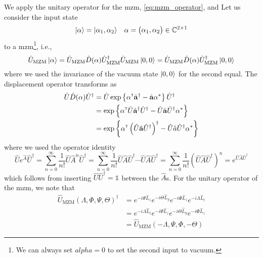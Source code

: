 We apply the unitary operator for the \gls{mzm}, \cref{eq:mzm_operator}, and 
Let us consider the input state
\begin{align}
	\ket{\vb{\alpha}}
	&=
	\ket{\alpha_1,\alpha_2}
	&
	\vb{\alpha}
	=
	\begin{pmatrix}
		\alpha_1,
		\alpha_2
	\end{pmatrix}
	\in
	\mathbb{C}^{2\times1}
\end{align}
to a \gls{mzm}\footnote{We can always set $alpha=0$ to set the second input to vacuum.}, i.e.,
\begin{equation}
	\hat{U}_\text{MZM}
	\ket{\vb{\alpha}}
	=
	\hat{U}_\text{MZM}
	\hat{D}(\vb{\alpha})
	\hat{U}_\text{MZM}^\dagger
	\hat{U}_\text{MZM}
	\ket{0,0}
	=
	\hat{U}_\text{MZM}
	\hat{D}(\vb{\alpha})
	\hat{U}_\text{MZM}^\dagger
	\ket{0,0}
\end{equation}
where we used the invariance of the vacuum state $\ket{0,0}$ for the second equal.
The displacement operator transforms as
\begin{equation}
	\begin{split}
		\hat{U}
		\hat{D}(\vb{\alpha})
		\hat{U}^\dagger
		&=
		\hat{U}
		\exp\left\{
			\vb{\alpha}^{\scriptscriptstyle\mathsf{T}}
			\hat{\vb{a}}^\dagger
			-
			\hat{\vb{a}}
			\vb{\alpha}^*
		\right\}
		\hat{U}^\dagger
		\\
		&=
		\exp\left\{
			\vb{\alpha}^{\scriptscriptstyle\mathsf{T}}
			\hat{U}
			\hat{\vb{a}}^\dagger
			\hat{U}^\dagger
			-
			\hat{U}
			\hat{\vb{a}}
			\hat{U}^\dagger
			\vb{\alpha}^*
		\right\}
		\\
		&=
		\exp\left\{
			\vb{\alpha}^{\scriptscriptstyle\mathsf{T}}
			\left(
				\hat{U}
				\hat{\vb{a}}
				\hat{U}^\dagger
			\right)^\dagger
			-
			\hat{U}
			\hat{a}
			\hat{U}^\dagger
			\vb{\alpha}^*
		\right\}
	\end{split}
\end{equation}
where we used the operator identity
\begin{equation}
	\hat{U}
	e^{\hat{A}}
	\hat{U}^\dagger
	=
	\sum_{n=0}^\infty
	\frac{1}{n!}
	\hat{U}
	\hat{A}^n
	\hat{U}^\dagger
	=
	\sum_{n=0}^\infty
	\frac{1}{n!}
	\hat{U}
	\hat{A}
	\hat{U}^\dagger
	\cdots
	\hat{U}
	\hat{A}
	\hat{U}^\dagger
	=
	\sum_{n=0}^\infty
	\frac{1}{n!}
	\left(
		\hat{U}
		\hat{A}
		\hat{U}^\dagger
	\right)^n
	=
	e^{\hat{U}\hat{A}\hat{U}^\dagger}
\end{equation}
which follows from inserting $\hat{U}\hat{U}^\dagger=\mathbb{1}$ between the $\hat{A}$s.
For the unitary operator of the \gls{mzm}, we note that
\begin{equation}
	\begin{split}
		\hat{U}_\text{MZM}(\Lambda,\Phi,\Psi,\Theta)^\dagger
		&=
		e^{-i\Psi\hat{L}_z}
		e^{-i\Theta\hat{L}_y}
		e^{-i\Phi\hat{L}_z}
		e^{-i\Lambda\hat{L}_t}
		\\
		&=
		e^{-i\Lambda\hat{L}_t}
		e^{-i\Psi\hat{L}_z}
		e^{-i\Theta\hat{L}_y}
		e^{-i\Phi\hat{L}_z}
		\\
		&=
		\hat{U}_\text{MZM}(-\Lambda,\Psi,\Phi,-\Theta)
	\end{split}
\end{equation}
